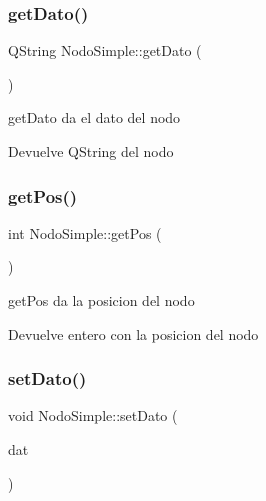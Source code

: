 \subsubsection{\texorpdfstring{get\+Dato()}{getDato()}}
{\footnotesize\ttfamily Q\+String Nodo\+Simple\+::get\+Dato (\begin{DoxyParamCaption}{ }\end{DoxyParamCaption})\hspace{0.3cm}{\ttfamily [inline]}}



get\+Dato da el dato del nodo 

\begin{DoxyReturn}{Devuelve}
Q\+String del nodo 
\end{DoxyReturn}
\mbox{\label{class_nodo_simple_a6808405a250b6a7b097d34767dfa9b30}} 
\subsubsection{\texorpdfstring{get\+Pos()}{getPos()}}
{\footnotesize\ttfamily int Nodo\+Simple\+::get\+Pos (\begin{DoxyParamCaption}{ }\end{DoxyParamCaption})\hspace{0.3cm}{\ttfamily [inline]}}



get\+Pos da la posicion del nodo 

\begin{DoxyReturn}{Devuelve}
entero con la posicion del nodo 
\end{DoxyReturn}
\mbox{\label{class_nodo_simple_ab32eeae9ba44f0464a5d45c69602cd11}} 
\subsubsection{\texorpdfstring{set\+Dato()}{setDato()}}
{\footnotesize\ttfamily void Nodo\+Simple\+::set\+Dato (\begin{DoxyParamCaption}\item[{Q\+String}]{dat }\end{DoxyParamCaption})\hspace{0.3cm}{\ttfamily [inline]}}



